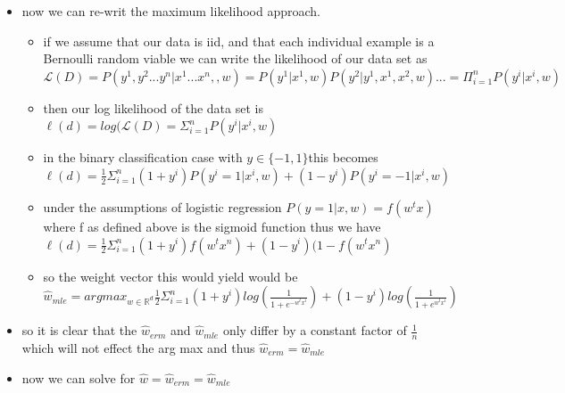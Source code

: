 \documentclass{article}
\theoremstyle{plain}
\theoremstyle{definition}
\begin{document}
\begin{enumerate}
\begin{itemize}
\begin{itemize}
    \item notice further that if we define the sigmoid function as $f(x)=\frac{1}{1+e^{-x}}$
    we can express our problem as $\hat{w}_{erm}= argmax_{w\in \mathbb{R}^{d}}\frac{1}{2n}\Sigma_{i=1}^{n}(1+y^i)log(\frac{1}{1+e^{-w^tx^i}})+(1-y^i)log(\frac{1}{1+e^{w^tx^i}}) = argmax_{w\in \mathbb{R}^{d}}\frac{1}{2n}\Sigma_{i=1}^{n}(1+y^i)f(w^tx^i)+(1-y^i)f(-w^tx^i)$
    \item further note the following equality $1-f(x)=1-\frac{1}{1+e^{-x}}=\frac{e^{-x}}{1+e^{-x}}=\frac{1}{1+e^x}=f(-x)$
    \item so substituting this back into our erm function yields our final result for erm $$\hat{w}_{erm}=argmax_{w\in \mathbb{R}^{d}}\frac{1}{2n}\Sigma_{i=1}^{n}(1+y^i)log(f(x))+(1-y^i)log(1-f(x))$$
\end{itemize}
\item now we can re-writ the maximum likelihood approach. 
\begin{itemize}
    \item if we assume that our data is iid, and that each individual example is a Bernoulli random viable we can write the likelihood of our data set as $\mathcal{L}(D)=P(y^1,y^2...y^n|x^1...x^n,,w)=P(y^1|x^1,w)P(y^2|y^1,x^1,x^2,w)...=\Pi_{i=1}^{n}P(y^i|x^i, w)$ 
    \item then our log likelihood of the data set is $\ell(d)=log(\mathcal{L}(D)=\Sigma_{i=1}^{n}P(y^i|x^i,w)$
    \item in the binary classification case with $y\in\{-1,1\}$this becomes $\ell(d)=\frac{1}{2}\Sigma_{i=1}^{n}(1+y^i)P(y^i=1|x^i,w)+(1-y^i)P(y^i=-1|x^i,w)$
    \item under the assumptions of logistic regression $P(y=1|x,w)=f(w^tx)$ where f as defined above is the sigmoid function thus we have $\ell(d)=\frac{1}{2}\Sigma_{i=1}^{n}(1+y^i)f(w^tx^n)+(1-y^i)(1-f(w^tx^n)$
    \item so the weight vector this would yield would be    $\hat{w}_{mle}= argmax_{w\in \mathbb{R}^{d}}\frac{1}{2}\Sigma_{i=1}^{n}(1+y^i)log(\frac{1}{1+e^{-w^tx^i}})+(1-y^i)log(\frac{1}{1+e^{w^tx^i}}) $
\end{itemize}
\item so it is clear that the $\hat{w}_{erm}$ and $\hat{w}_{mle}$ only differ by a constant factor of $\frac{1}{n}$ which will not effect the arg max and thus $\hat{w}_{erm}=\hat{w}_{mle}$
\item now we can solve for $\hat{w}=\hat{w}_{erm}=\hat{w}_{mle}$
\begin{itemize}

\end{itemize}
\end{itemize}
\end{enumerate}
\end{document}

